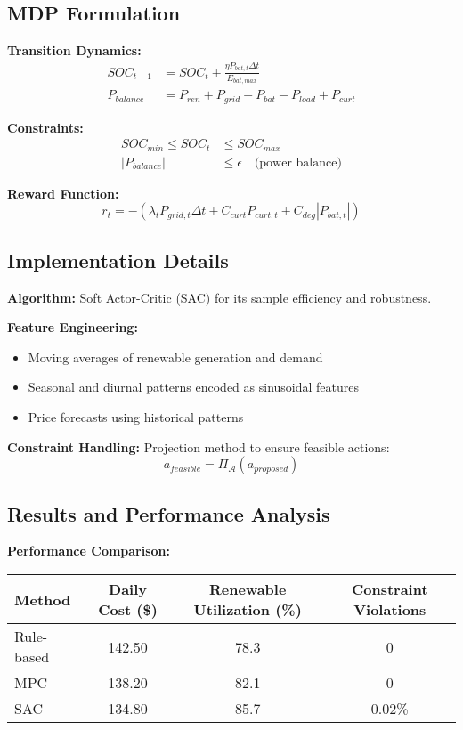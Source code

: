 \subsection{MDP Formulation}

\textbf{Transition Dynamics:}
\begin{align}
SOC_{t+1} &= SOC_t + \frac{\eta P_{bat,t} \Delta t}{E_{bat,max}} \\
P_{balance} &= P_{ren} + P_{grid} + P_{bat} - P_{load} + P_{curt}
\end{align}

\textbf{Constraints:}
\begin{align}
SOC_{min} \leq SOC_t &\leq SOC_{max} \\
|P_{balance}| &\leq \epsilon \quad \text{(power balance)}
\end{align}

\textbf{Reward Function:}
\begin{equation}
r_t = -(\lambda_t P_{grid,t} \Delta t + C_{curt} P_{curt,t} + C_{deg} |P_{bat,t}|)
\end{equation}

\subsection{Implementation Details}

\textbf{Algorithm:} Soft Actor-Critic (SAC) for its sample efficiency and robustness.

\textbf{Feature Engineering:}
\begin{itemize}
    \item Moving averages of renewable generation and demand
    \item Seasonal and diurnal patterns encoded as sinusoidal features
    \item Price forecasts using historical patterns
\end{itemize}

\textbf{Constraint Handling:} Projection method to ensure feasible actions:
\begin{equation}
a_{feasible} = \Pi_{\mathcal{A}}(a_{proposed})
\end{equation}

\subsection{Results and Performance Analysis}

\textbf{Performance Comparison:}
\begin{center}
\begin{tabular}{lccc}
\toprule
Method & Daily Cost (\$) & Renewable Utilization (\%) & Constraint Violations \\
\midrule
Rule-based & 142.50 & 78.3 & 0 \\
MPC & 138.20 & 82.1 & 0 \\
SAC & 134.80 & 85.7 & 0.02\% \\
\bottomrule
\end{tabular}
\end{center}

